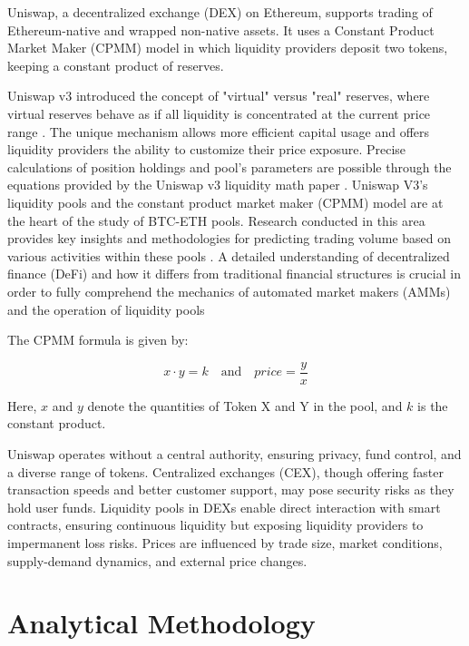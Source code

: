 \documentclass{article}
\begin{document}
Uniswap, a decentralized exchange (DEX) on Ethereum, supports trading of Ethereum-native and wrapped non-native assets. It uses a Constant Product Market Maker (CPMM) model in which liquidity providers deposit two tokens, keeping a constant product of reserves\cite{Miori2023, Heimbach2022,Miori2023}.

Uniswap v3 introduced the concept of "virtual" versus "real" reserves, where virtual reserves behave as if all liquidity is concentrated at the current price range \cite{Elsts2021}. The unique mechanism allows more efficient capital usage and offers liquidity providers the ability to customize their price exposure. Precise calculations of position holdings and pool's parameters are possible through the equations provided by the Uniswap v3 liquidity math paper \cite{Elsts2021,Miori2023}. Uniswap V3's liquidity pools and the constant product market maker (CPMM) model are at the heart of the study of BTC-ETH pools. Research conducted in this area provides key insights and methodologies for predicting trading volume based on various activities within these pools \cite{Miori2023}. A detailed understanding of decentralized finance (DeFi) and how it differs from traditional financial structures is crucial in order to fully comprehend the mechanics of automated market makers (AMMs) and the operation of liquidity pools \cite{Makarov2022}

The CPMM formula is given by:

\[x \cdot y = k \quad \text{and} \quad price = \frac{y}{x}\]

Here, \(x\) and \(y\) denote the quantities of Token X and Y in the pool, and \(k\) is the constant product\cite{Makarov2022,Miori2023}.

Uniswap operates without a central authority, ensuring privacy, fund control, and a diverse range of tokens\cite{Miori2023}. Centralized exchanges (CEX), though offering faster transaction speeds and better customer support, may pose security risks as they hold user funds\cite{Makarov2022}. Liquidity pools in DEXs enable direct interaction with smart contracts, ensuring continuous liquidity but exposing liquidity providers to impermanent loss risks\cite{Aigner2021, Heimbach2022}. Prices are influenced by trade size, market conditions, supply-demand dynamics, and external price changes\cite{Miori2022,Heimbach2022,Miori2023}.

\section{\textbf{Analytical Methodology}}
\end{document}
